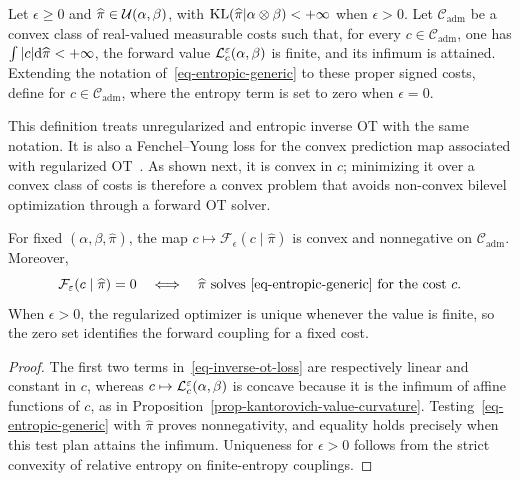 \begin{defn}\label{def-inverse-ot-loss}
Let $\epsilon\geq0$ and $\widehat\pi\in\Couplings(\alpha,\beta)$, with $\KL(\widehat\pi|\alpha\otimes\beta)<+\infty$ when $\epsilon>0$. Let $\mathcal C_{\mathrm{adm}}$ be a convex class of real-valued measurable costs such that, for every $c\in\mathcal C_{\mathrm{adm}}$, one has $\int|c|\d\widehat\pi<+\infty$, the forward value $\MK_c^\epsilon(\alpha,\beta)$ is finite, and its infimum is attained. Extending the notation of~\eqref{eq-entropic-generic} to these proper signed costs, define
for $c\in\mathcal C_{\mathrm{adm}}$, where the entropy term is set to zero when $\epsilon=0$.
\end{defn}

This definition treats unregularized and entropic inverse OT with the same notation. It is also a Fenchel--Young loss for the convex prediction map associated with regularized OT~\cite{andrade2025sharpened}. As shown next, it is convex in $c$; minimizing it over a convex class of costs is therefore a convex problem that avoids non-convex bilevel optimization through a forward OT solver.

\begin{prop}\label{prop-inverse-ot-convex}
	For fixed $(\alpha,\beta,\widehat\pi)$, the map $c\mapsto\mathcal F_\epsilon(c\mid\widehat\pi)$ is convex and nonnegative on $\mathcal C_{\mathrm{adm}}$. Moreover,
	\[
		\mathcal F_\epsilon(c\mid\widehat\pi)=0
		\quad\Longleftrightarrow\quad
		\widehat\pi\text{ solves~\eqref{eq-entropic-generic} for the cost }c.
	\]
	When $\epsilon>0$, the regularized optimizer is unique whenever the value is finite, so the zero set identifies the forward coupling for a fixed cost.
\end{prop}

\begin{proof}
	The first two terms in~\eqref{eq-inverse-ot-loss} are respectively linear and constant in $c$, whereas $c\mapsto\MK_c^\epsilon(\alpha,\beta)$ is concave because it is the infimum of affine functions of $c$, as in Proposition~\ref{prop-kantorovich-value-curvature}. Testing~\eqref{eq-entropic-generic} with $\widehat\pi$ proves nonnegativity, and equality holds precisely when this test plan attains the infimum. Uniqueness for $\epsilon>0$ follows from the strict convexity of relative entropy on finite-entropy couplings.
\end{proof}

